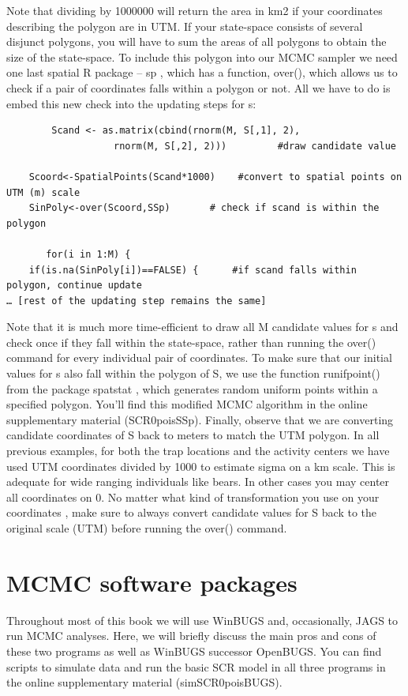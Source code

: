  Note that dividing by 1000000 will return the area in km2 if your coordinates describing the polygon are in UTM. If your state-space consists of several disjunct polygons, you will have to sum the areas of all polygons to obtain the size of the state-space.
To include this polygon into our MCMC sampler we need one last spatial R package – sp \citep{pebesma_bivand:2011}, which has a function, over(), which allows us to check if a pair of coordinates falls within a polygon or not. All we have to do is embed this new check into the updating steps for s:
\begin{verbatim}
        Scand <- as.matrix(cbind(rnorm(M, S[,1], 2),
                   rnorm(M, S[,2], 2)))	        #draw candidate value

	Scoord<-SpatialPoints(Scand*1000)    #convert to spatial points on UTM (m) scale
	SinPoly<-over(Scoord,SSp)		# check if scand is within the polygon

       for(i in 1:M) {
	if(is.na(SinPoly[i])==FALSE) {		#if scand falls within polygon, continue update
… [rest of the updating step remains the same]
\end{verbatim}
Note that it is much more time-efficient to draw all M candidate values for s and check once if they fall within the state-space, rather than running the over() command for every individual pair of coordinates. To make sure that our initial values for s also fall within the polygon of S, we use the function runifpoint() from the package spatstat \citep{baddeley_turner:2005}, which generates random uniform points within a specified polygon. You'll find this modified MCMC algorithm in the online supplementary material (SCR0poisSSp).
Finally, observe that we are converting candidate coordinates of S back to meters to match the UTM polygon. In all previous examples, for both the trap locations and the activity centers we have used UTM coordinates divided by 1000 to estimate sigma on a km scale. This is adequate for wide ranging individuals like bears. In other cases you may center all coordinates on 0. No matter what kind of transformation you use on your coordinates , make sure to always convert candidate values for S back to the original scale (UTM) before running the over() command.

\section{MCMC software packages}
Throughout most of this book we will use WinBUGS and, occasionally, JAGS to run MCMC analyses. Here, we will briefly discuss the main pros and cons of these two programs as well as WinBUGS successor OpenBUGS. You can find scripts to simulate data and run the basic SCR model in all three programs in the online supplementary material (simSCR0poisBUGS).

